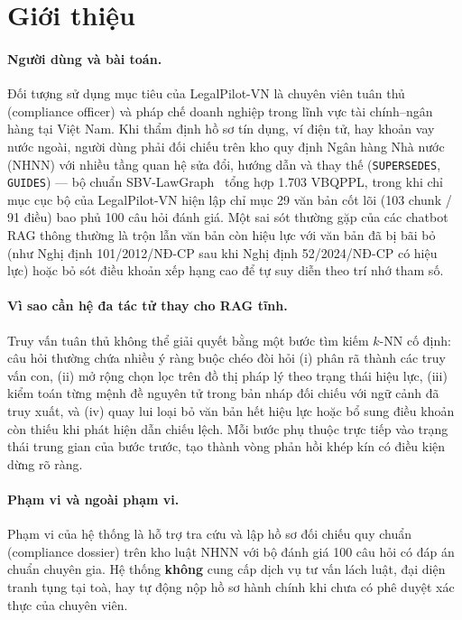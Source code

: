 \documentclass[sigconf,nonacm]{acmart}
\begin{document}
\maketitle

\section{Giới thiệu}
\label{sec:intro}

\paragraph{Người dùng và bài toán.}
Đối tượng sử dụng mục tiêu của LegalPilot-VN là chuyên viên tuân thủ (compliance officer) và pháp chế doanh nghiệp trong lĩnh vực tài chính--ngân hàng tại Việt Nam. Khi thẩm định hồ sơ tín dụng, ví điện tử, hay khoản vay nước ngoài, người dùng phải đối chiếu trên kho quy định Ngân hàng Nhà nước (NHNN) với nhiều tầng quan hệ sửa đổi, hướng dẫn và thay thế (\texttt{SUPERSEDES}, \texttt{GUIDES}) — bộ chuẩn SBV-LawGraph~\cite{phan2026sbv} tổng hợp 1.703 VBQPPL, trong khi chỉ mục cục bộ của LegalPilot-VN hiện lập chỉ mục 29 văn bản cốt lõi (103 chunk / 91 điều) bao phủ 100 câu hỏi đánh giá. Một sai sót thường gặp của các chatbot RAG thông thường là trộn lẫn văn bản còn hiệu lực với văn bản đã bị bãi bỏ (như Nghị định 101/2012/NĐ-CP sau khi Nghị định 52/2024/NĐ-CP có hiệu lực) hoặc bỏ sót điều khoản xếp hạng cao để tự suy diễn theo trí nhớ tham số.

\paragraph{Vì sao cần hệ đa tác tử thay cho RAG tĩnh.}
Truy vấn tuân thủ không thể giải quyết bằng một bước tìm kiếm $k$-NN cố định: câu hỏi thường chứa nhiều ý ràng buộc chéo đòi hỏi (i) phân rã thành các truy vấn con, (ii) mở rộng chọn lọc trên đồ thị pháp lý theo trạng thái hiệu lực, (iii) kiểm toán từng mệnh đề nguyên tử trong bản nháp đối chiếu với ngữ cảnh đã truy xuất, và (iv) quay lui loại bỏ văn bản hết hiệu lực hoặc bổ sung điều khoản còn thiếu khi phát hiện dẫn chiếu lệch. Mỗi bước phụ thuộc trực tiếp vào trạng thái trung gian của bước trước, tạo thành vòng phản hồi khép kín có điều kiện dừng rõ ràng.

\paragraph{Phạm vi và ngoài phạm vi.}
Phạm vi của hệ thống là hỗ trợ tra cứu và lập hồ sơ đối chiếu quy chuẩn (compliance dossier) trên kho luật NHNN với bộ đánh giá 100 câu hỏi có đáp án chuẩn chuyên gia. Hệ thống \textbf{không} cung cấp dịch vụ tư vấn lách luật, đại diện tranh tụng tại toà, hay tự động nộp hồ sơ hành chính khi chưa có phê duyệt xác thực của chuyên viên.
\end{document}
